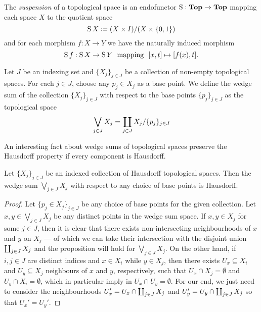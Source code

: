 \begin{definition}[Suspension]
\label{def:suspension}
The \emph{suspension} of a topological space is an endofunctor \(\operatorname{S}: {\textbf{Top}} \to
{\textbf{Top}}\) mapping each space \(X\) to the quotient space
\[
\operatorname{S} X \coloneq (X \times I)/(X \times \{0, 1\})
\]
and for each morphism \(f: X \to Y\) we have the naturally induced morphism
\[
\Susp f: \Susp X \to \Susp Y\ \text{ mapping }\ [x, t] \mapsto [f(x), t].
\]
\end{definition}


\begin{example}
\label{exp:wedge-sum-space}
Let \(J\) be an indexing set and \(\{X_j\}_{j \in J}\) be a collection of
non-empty topological spaces. For each \(j \in J\), choose any \(p_j \in X_j\)
as a base point. We define the wedge sum of the collection \(\{X_{j}\}_{j \in
J}\) with respect to the base points \(\{p_{j}\}_{j \in J}\) as the topological
space
\[
  \bigvee_{j \in J} X_j = \coprod_{j \in J} X_j / \{p_{j}\}_{j \in J}
\]
\end{example}

An interesting fact about wedge sums of topological spaces preserve the
Hausdorff property if every component is Hausdorff.

\begin{proposition}
\label{prop:hausdorff-wedge-sum}
Let \(\{X_{j}\}_{j \in J}\) be an indexed collection of Hausdorff topological
spaces. Then the wedge sum \(\bigvee_{j \in J} X_j\) with respect to any choice
of base points is Hausdorff.
\end{proposition}

\begin{proof}
Let \(\{p_j \in X_j\}_{j \in J}\) be any choice of base points for the given
collection. Let \(x, y \in \bigvee_{j \in J} X_j\) be any distinct points in the
wedge sum space. If \(x, y \in X_j\) for some \(j \in J\), then it is clear that
there exists non-intersecting neighbourhoods of \(x\) and \(y\) on \(X_j\) ---
of which we can take their intersection with the disjoint union \(\coprod_{j \in
J} X_j\) and the proposition will hold for \(\bigvee_{j \in J} X_j\). On the
other hand, if \(i, j \in J\) are distinct indices and \(x \in X_i\) while \(y
\in X_j\), then there exists \(U_x \subseteq X_i\) and \(U_y \subseteq X_j\)
neighbours of \(x\) and \(y\), respectively, such that \(U_x \cap X_j =
\emptyset\) and \(U_y \cap X_i = \emptyset\), which in particular imply in \(U_x
\cap U_y= \emptyset\). For our end, we just need to consider the neighbourhoods
\(U_x' = U_x \cap \coprod_{j \in J} X_j\) and \(U_y' = U_y \cap \coprod_{j \in J}
X_j\) so that \(U_x' = U_y'\).
\end{proof}

